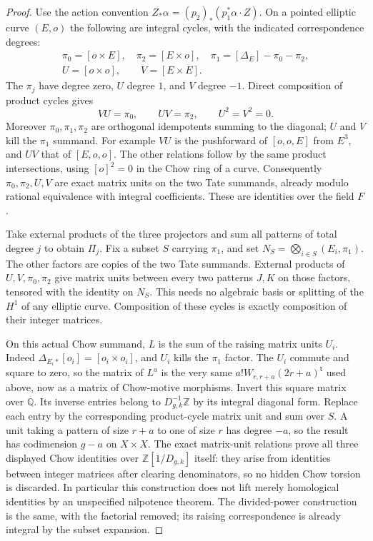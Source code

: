 \begin{proof}
Use the action convention
$Z_*\alpha=(p_2)_*(p_1^*\alpha\cdot Z)$.
On a pointed elliptic curve $(E,o)$ the following are integral
cycles, with the indicated correspondence degrees:
\[
 \begin{gathered}
 \pi_0=[o\times E],\quad \pi_2=[E\times o],\quad
 \pi_1=[\Delta_E]-\pi_0-\pi_2,\\
 U=[o\times o],\qquad V=[E\times E].
 \end{gathered}
\]
The $\pi_j$ have degree zero, $U$ degree $1$, and $V$ degree
$-1$.  Direct composition of product cycles gives
\[
 VU=\pi_0,\qquad UV=\pi_2,\qquad U^2=V^2=0.
\]
Moreover $\pi_0,\pi_1,\pi_2$ are orthogonal idempotents
summing to the diagonal; $U$ and $V$ kill the $\pi_1$ summand.
For example $VU$ is the pushforward of $[o,o,E]$ from
$E^3$, and $UV$ that of $[E,o,o]$.  The other relations follow
by the same product intersections, using $[o]^2=0$ in the
Chow ring of a curve.  Consequently
$\pi_0,\pi_2,U,V$ are exact matrix units on the two Tate
summands, already modulo rational equivalence with integral
coefficients.  These are identities over the field $F$.

Take external products of the three projectors and sum all
patterns of total degree $j$ to obtain $\Pi_j$.
Fix a subset $S$ carrying $\pi_1$, and set
$N_S=\bigotimes_{i\in S}(E_i,\pi_1)$.
The other factors are copies of the two Tate summands.
External products of $U,V,\pi_0,\pi_2$ give matrix units
between every two patterns $J,K$ on those factors, tensored
with the identity on $N_S$.  This needs no algebraic basis
or splitting of the $H^1$ of any elliptic curve.
Composition of these cycles is exactly composition of their
integer matrices.

On this actual Chow summand, $L$ is the sum of the raising
matrix units $U_i$.  Indeed $\Delta_{E_i*}[o_i]=[o_i\times o_i]$,
and $U_i$ kills the $\pi_1$ factor.  The $U_i$ commute and
square to zero, so the matrix of $L^a$ is the very same
$a!W_{r,r+a}(2r+a)^{\mathsf t}$ used above, now as a
matrix of Chow-motive morphisms.  Invert this square matrix
over $\mathbb Q$.  Its inverse entries belong to
$D_{g,k}^{-1}\mathbb Z$ by its integral diagonal form.
Replace each entry by the corresponding product-cycle
matrix unit and sum over $S$.  A unit taking a pattern of
size $r+a$ to one of size $r$ has degree $-a$, so the result
has codimension $g-a$ on $X\times X$.
The exact matrix-unit relations prove all three displayed
Chow identities over $\mathbb Z[1/D_{g,k}]$ itself:
they arise from identities between integer matrices after
clearing denominators, so no hidden Chow torsion is discarded.
In particular this construction does not
lift merely homological identities by an unspecified
nilpotence theorem.  The divided-power construction is the
same, with the factorial removed; its raising correspondence
is already integral by the subset expansion.


\end{proof}
